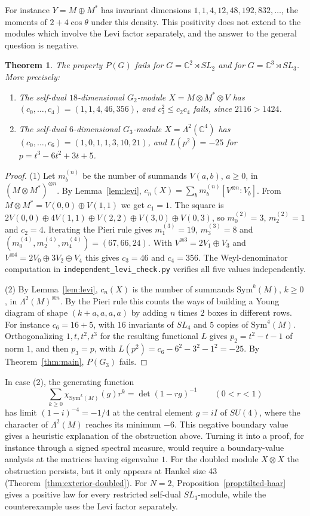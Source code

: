 \documentclass[11pt,reqno]{amsart}
\newtheorem{theorem}{Theorem}[section]
\theoremstyle{definition}
\newcommand{\CC}{\mathbb C}
\begin{document}
For instance $Y=M\oplus M^*$ has invariant dimensions $1,1,4,12,48,192,832,\ldots$, the moments of $2+4\cos\theta$ under this density. This positivity does not extend to the modules which involve the Levi factor separately, and the answer to the general question is negative.

\begin{theorem}\label{thm:levi}
The property $P(G)$ fails for $G=\CC^2\rtimes SL_2$ and for $G=\CC^3\rtimes SL_3$. More precisely:
\begin{enumerate}
\item The self-dual $18$-dimensional $G_2$-module $X=M\otimes M^*\otimes V$ has
$(c_0,\ldots,c_4)=(1,1,4,46,356)$,
and $c_3^2\leq c_2c_4$ fails, since $2116>1424$.
\item The self-dual $6$-dimensional $G_3$-module $X=\Lambda^2(\CC^4)$ has
$(c_0,\ldots,c_6)=(1,0,1,1,3,10,21)$,
and $L(p^2)=-25$ for $p=t^3-6t^2+3t+5$.
\end{enumerate}
\end{theorem}

\begin{proof}
(1) Let $m^{(n)}_b$ be the number of summands $V(a,b)$, $a\geq0$, in $(M\otimes M^*)^{\otimes n}$. By Lemma~\ref{lem:levi}, $c_n(X)=\sum_bm^{(n)}_b[V^{\otimes n}:V_b]$. From $M\otimes M^*=V(0,0)\oplus V(1,1)$ we get $c_1=1$. The square is $2V(0,0)\oplus4V(1,1)\oplus V(2,2)\oplus V(3,0)\oplus V(0,3)$, so $m^{(2)}_0=3$, $m^{(2)}_2=1$ and $c_2=4$. Iterating the Pieri rule gives $m^{(3)}_1=19$, $m^{(3)}_3=8$ and $(m^{(4)}_0,m^{(4)}_2,m^{(4)}_4)=(67,66,24)$. With $V^{\otimes3}=2V_1\oplus V_3$ and $V^{\otimes4}=2V_0\oplus3V_2\oplus V_4$ this gives $c_3=46$ and $c_4=356$. The Weyl-denominator computation in \texttt{independent\_levi\_check.py} verifies all five values independently.

(2) By Lemma~\ref{lem:levi}, $c_n(X)$ is the number of summands $\mathrm{Sym}^k(M)$, $k\geq0$, in $\Lambda^2(M)^{\otimes n}$. By the Pieri rule this counts the ways of building a Young diagram of shape $(k+a,a,a,a)$ by adding $n$ times $2$ boxes in different rows. For instance $c_6=16+5$, with $16$ invariants of $SL_4$ and $5$ copies of $\mathrm{Sym}^4(M)$. Orthogonalizing $1,t,t^2,t^3$ for the resulting functional $L$ gives $p_2=t^2-t-1$ of norm $1$, and then $p_3=p$, with $L(p^2)=c_6-6^2-3^2-1^2=-25$. By Theorem~\ref{thm:main}, $P(G_3)$ fails.
\end{proof}

In case (2), the generating function
\[
 \sum_{k\geq0}\chi_{\mathrm{Sym}^k(M)}(g)r^k=\det(1-rg)^{-1}\qquad(0<r<1)
\]
has limit $(1-i)^{-4}=-1/4$ at the central element $g=iI$ of $SU(4)$, where the character of $\Lambda^2(M)$ reaches its minimum $-6$. This negative boundary value gives a heuristic explanation of the obstruction above. Turning it into a proof, for instance through a signed spectral measure, would require a boundary-value analysis at the matrices having eigenvalue $1$. For the doubled module $X\otimes X$ the obstruction persists, but it only appears at Hankel size 43 (Theorem~\ref{thm:exterior-doubled}). For $N=2$, Proposition~\ref{prop:tilted-haar} gives a positive law for every restricted self-dual $SL_3$-module, while the counterexample uses the Levi factor separately.
\end{document}
